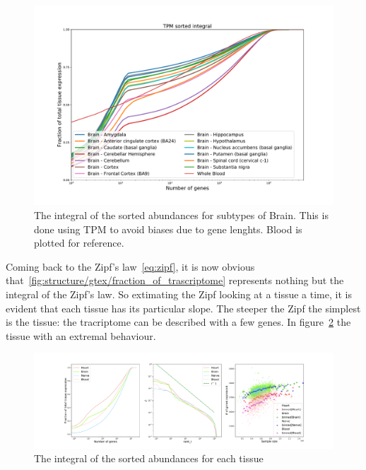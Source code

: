 \begin{figure}[htb!]
  \centering
  \includegraphics[width=0.9\linewidth]{pictures/structure/gtex/fraction_of_trascriptome_Brain.pdf}
  \caption{The integral of the sorted abundances for subtypes of Brain. This is done using TPM to avoid biases due to gene lenghts. Blood is plotted for reference.}
  \label{fig:structure/gtex/fraction_of_trascriptome_Brain}
\end{figure}

Coming back to the Zipf's law~\ref{eq:zipf}, it is now obvious that~\ref{fig:structure/gtex/fraction_of_trascriptome} represents nothing but the integral of the Zipf's law. So extimating the Zipf looking at a tissue a time, it is evident that each tissue has its particular slope. The steeper the Zipf the simplest is the tissue: the tracriptome can be described with a few genes. In figure~\ref{fig:structure/gtex/zipf_tissue} the tissue with an extremal behaviour.
\begin{figure}[htb!]
  \centering
  \includegraphics[width=0.6\linewidth]{pictures/structure/gtex/zipf_tissue.pdf}
  \caption{The integral of the sorted abundances for each tissue}
  \label{fig:structure/gtex/zipf_tissue}
\end{figure}

